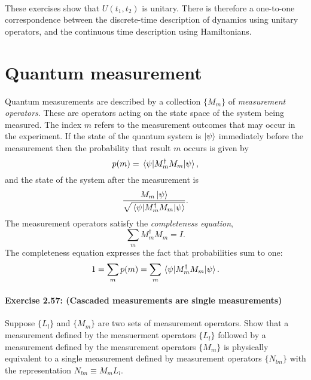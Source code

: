 \paragraph{} These exercises show that $U(t_1, t_2)$ is unitary. There is
therefore a one-to-one correspondence between the discrete-time description of
dynamics using unitary operators, and the continuous time description using
Hamiltonians.

\section{Quantum measurement}

\begin{postulate}
  Quantum measurements are described by a collection $\{M_m\}$ of
  \emph{measurement operators}. These are operators acting on the state space
  of the system being measured. The index $m$ refers to the measurement
  outcomes that may occur in the experiment. If the state of the quantum
  system is $\ket{\psi}$ immediately before the measurement then the
  probability that result $m$ occurs is given by \begin{equation*}
    p(m) = \mel{\psi}{M_m^\dagger M_m}{\psi},
  \end{equation*} and the state of the system after the measurement is
  \begin{equation*}
    \frac{M_m\ket{\psi}}{\sqrt{\mel{\psi}{M_m^\dagger M_m}{\psi}}}.
  \end{equation*}
  The measurement operators satisfy the \emph{completeness equation},
  \begin{equation*}
    \sum_m M_m^\dagger M_m = I.
  \end{equation*}
  The completeness equation expresses the fact that probabilities sum to one:
  \begin{equation*}
    1 = \sum_mp(m) = \sum_m\mel{\psi}{M_m^\dagger M_m}{\psi}.
  \end{equation*}
\end{postulate}

\paragraph{\cite{mikeandike} Exercise 2.57: (Cascaded measurements are single
measurements)} Suppose $\{L_l\}$ and $\{M_m\}$ are two sets of measurement
operators. Show that a measurement defined by the measuerment operators
$\{L_l\}$ followed by a measurement defined by the measurement operators
$\{M_m\}$ is physically equivalent to a single measurement defined by
measurement operators $\{N_{lm}\}$ with the representation $N_{lm} \equiv M_m
L_l$.


